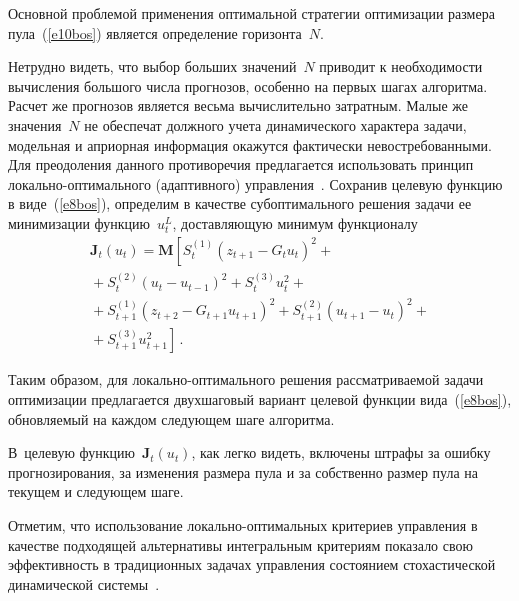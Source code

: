 \begin{multicols}{2}
  Основной проблемой применения оптимальной стратегии оптимизации размера 
пула~(\ref{e10bos}) является определение горизонта~$N$. 

Нетрудно видеть, что выбор 
больших значений~$N$ приводит к необхо\-ди\-мости вычисления большого числа прогнозов, 
особенно на первых шагах алгоритма. Расчет же прогнозов является весьма вычислительно 
затратным. Малые же значения~$N$ не обеспечат должного учета динамического характера 
задачи, модельная и априорная информация окажутся фактически невостребованными. Для 
преодоления данного противоречия предлагается использовать принцип локально-оп\-ти\-маль\-но\-го 
(адаптивного) управ\-ле\-ния~\cite{9bos}. Сохранив целевую функцию в 
виде~(\ref{e8bos}), определим в качестве субоптимального решения задачи ее минимизации 
функцию~$u_t^L$, доставляющую минимум функционалу
  \begin{multline*}
  \mathbf{J}_t(u_t) =\mathbf{M}\left[ S_t^{(1)}(z_{t+1}-G_t u_t)^2+{}\right.\\[2pt]
  {}+S_t^{(2)}(u_t-u_{t-
1})^2+S_t^{(3)}u_t^2+{}\\[2pt]
{}+S^{(1)}_{t+1}(z_{t+2}-G_{t+1} u_{t+1})^2+S_{t+1}^{(2)}(u_{t+1}-
u_t)^2+{}\\[2pt]
\left.{}+S^{(3)}_{t+1} u^2_{t+1}\right]\,.
  \end{multline*}

  Таким образом, для локально-оптимального решения рассматриваемой задачи 
оптимизации предлагается двухшаговый вариант целевой функции вида~(\ref{e8bos}), 
обновляемый на каждом следующем шаге алгоритма. 

В~целевую 
функцию~$\mathbf{J}_t(u_t)$, как легко видеть, включены штрафы за ошибку 
прогнозирования, за изменения размера пула и за собственно размер пула на текущем и 
следующем шаге.
  
  Отметим, что использование локально-оп\-ти\-маль\-ных критериев управления в качестве 
подходящей альтернативы интегральным критериям показало свою эффективность в 
традиционных задачах управ\-ле\-ния состоянием стохастической динамической 
системы~\cite{10bos, 11bos}.
  

\end{multicols}
